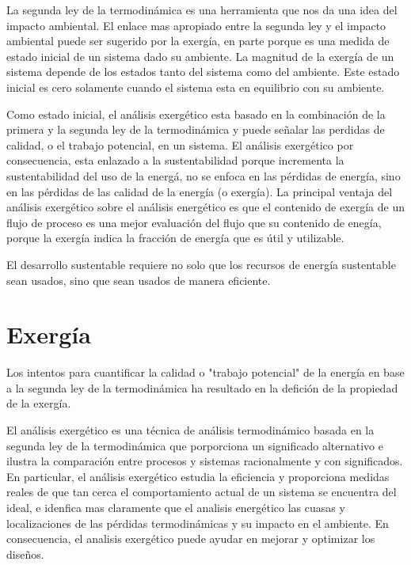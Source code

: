 \documentclass[12pt, twoside]{report}
\begin{document}
La segunda ley de la termodinámica es una herramienta que nos da una idea del impacto ambiental. El enlace mas apropiado entre la segunda ley y el impacto ambiental puede ser sugerido por la exergía, en parte porque es una medida de estado inicial de un sistema dado su ambiente. La magnitud de la exergía de un sistema depende de los estados tanto del sistema como del ambiente. Este estado inicial es cero solamente cuando el sistema esta en equilibrio con su ambiente.

Como estado inicial, el análisis exergético esta basado en la combinación de la primera y la segunda ley de la termodinámica y puede señalar las perdidas de calidad, o el trabajo potencial, en un sistema. El análisis exergético por consecuencia, esta enlazado a la sustentabilidad porque incrementa la sustentabilidad del uso de la energá, no se enfoca en las pérdidas de energía, sino en las pérdidas de las calidad de la energía (o exergía). La principal ventaja del análisis exergético sobre el análisis energético es que el contenido de exergía de un flujo de proceso es una mejor evaluación  del flujo que su contenido de enegía, porque la exergía indica la fracción de energía que es útil y utilizable. 

El desarrollo sustentable requiere no solo que los recursos de energía sustentable sean usados, sino que sean usados de manera eficiente. 

\section{Exergía}

Los intentos para cuantificar la calidad o "trabajo potencial" de la energía en base a la segunda ley de la termodinámica ha resultado en la defición de la propiedad de la exergía.

El análisis exergético es una técnica de análisis termodinámico basada en la segunda ley de la termodinámica que porporciona un significado alternativo e ilustra la comparación entre procesos y sistemas racionalmente y con significados. En particular, el análisis exergético estudia la eficiencia y proporciona medidas reales de que tan cerca el comportamiento actual de un sistema se encuentra del ideal, e idenfica mas claramente que el analisis energético las cuasas y localizaciones de las pérdidas termodinámicas y su impacto en el ambiente. En consecuencia, el analisis exergético puede ayudar en mejorar y optimizar los diseños.
\end{document}
